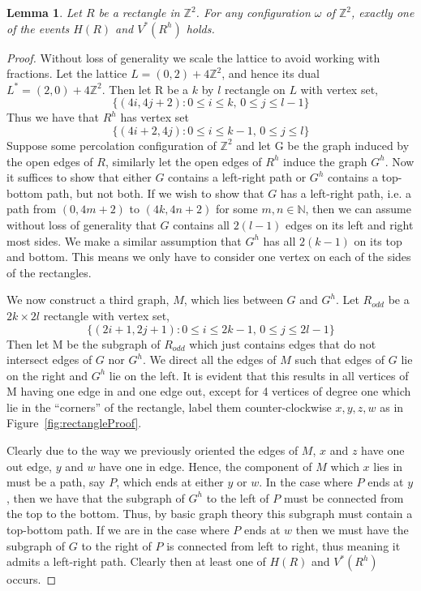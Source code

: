 \documentclass[a4paper,11pt]{article}
\newtheorem{lemma}[theorem]{Lemma}
\theoremstyle{definition}
\newcommand{\ints}{\mathbb{Z}}
\begin{document}
\begin{lemma}\label{rectangleProof}
	Let $R$ be a rectangle in $\ints^2$. For any configuration $\omega$ of $\ints^2$, exactly one of the events $H(R)$ and $V^*(R^h)$ holds.
\end{lemma}

\begin{proof}
	Without loss of generality we scale the lattice to avoid working with fractions. Let the lattice $L = (0,2) + 4\ints^2$, and hence its dual $L^* = (2,0)+4\ints^2$. Then let R be a $k$ by $l$ rectangle on $L$ with vertex set, 
	$$\{(4i,4j+2): 0 \leq i \leq k \text{, } 0 \leq j \leq l-1 \}$$ 
	Thus we have that $R^h$ has vertex set 
	$$\{(4i+2,4j): 0 \leq i \leq k-1 \text{, } 0 \leq j \leq l \}$$
	Suppose some percolation configuration of $\ints^2$ and let G be the graph induced by the open edges of $R$, similarly let the open edges of $R^h$ induce the graph $G^h$. Now it suffices to show that either $G$ contains a left-right path or $G^h$ contains a top-bottom path, but not both. If we wish to show that $G$ has a left-right path, i.e. a path from $(0,4m+2)$ to $(4k,4n+2)$ for some $m,n \in \mathbb{N}$, then we can assume without loss of generality that $G$ contains all $2(l-1)$ edges on its left and right most sides. We make a similar assumption that $G^h$ has all $2(k-1)$ on its top and bottom. This means we only have to consider one vertex on each of the sides of the rectangles.


	We now construct a third graph, $M$, which lies between $G$ and $G^h$. Let $R_{odd}$ be a $2k\times 2l$ rectangle with vertex set, 
	$$\{(2i+1,2j+1): 0 \leq i \leq 2k-1 \text{, } 0 \leq j \leq 2l-1 \}$$ 
	Then let M be the subgraph of $R_{odd}$ which just contains edges that do not intersect edges of $G$ nor $G^h$. We direct all the edges of $M$ such that edges of $G$ lie on the right and $G^h$ lie on the left. It is evident that this results in all vertices of M having one edge in and one edge out, except for 4 vertices of degree one which lie in the ``corners'' of the rectangle, label them counter-clockwise $x,y,z,w$ as in Figure~\ref*{fig:rectangleProof}.
	
	Clearly due to the way we previously oriented the edges of $M$, $x$ and $z$ have one out edge, $y$ and $w$ have one in edge. Hence, the component of $M$ which $x$ lies in must be a path, say $P$, which ends at either $y$ or $w$. In the case where $P$ ends at $y$, then we have that the subgraph of $G^h$ to the left of $P$ must be connected from the top to the bottom. Thus, by basic graph theory this subgraph must contain a top-bottom path. If we are in the case where $P$ ends at $w$ then we must have the subgraph of $G$ to the right of $P$ is connected from left to right, thus meaning it admits a left-right path. Clearly then at least one of $H(R)$ and $V^*(R^h)$ occurs.


\end{proof}
\end{document}
